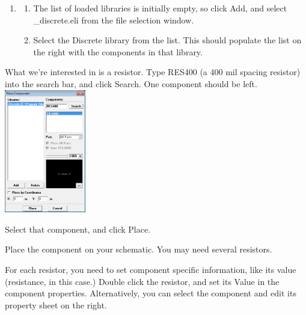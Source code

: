 \documentclass[letterpaper]{article}
\newcounter{saveenum}
\newcommand\liststyleRTFNumvi{%
\renewcommand\theenumi{\arabic{enumi}}
\renewcommand\theenumii{\alph{enumii}}
\renewcommand\theenumiii{\roman{enumiii}}
\renewcommand\theenumiv{\arabic{enumiv}}
\renewcommand\labelenumi{\theenumi.}
\renewcommand\labelenumii{\theenumii.}
\renewcommand\labelenumiii{\theenumiii.}
\renewcommand\labelenumiv{\theenumiv.}
}
\begin{document}
\liststyleRTFNumvi
\setcounter{saveenum}{\value{enumi}}
\begin{enumerate}
\setcounter{enumi}{\value{saveenum}}
\item \setcounter{saveenum}{\value{enumii}}
\begin{enumerate}
\setcounter{enumii}{\value{saveenum}}
\item {\sffamily\color[rgb]{0.30980393,0.5058824,0.7411765}
The list of loaded libraries is initially empty, so click {\textquotedbl}Add{\textquotedbl}, and select
{\textquotedbl}\_discrete.eli{\textquotedbl} from the file selection window.}
\item {\sffamily\color[rgb]{0.30980393,0.5058824,0.7411765}
Select the Discrete library from the list. This should populate the list on the right with the components in that
library.}
\end{enumerate}
\end{enumerate}
{\sffamily\color[rgb]{0.30980393,0.5058824,0.7411765}
What we're interested in is a resistor. Type {\textquotedbl}RES400{\textquotedbl} (a 400 mil spacing resistor) into the
search bar, and click {\textquotedbl}Search.{\textquotedbl} One component should be left.\newline
 \includegraphics[width=1.3957in,height=2.1209in]{figures/ee4document-img020.png} }

{\sffamily\color[rgb]{0.30980393,0.5058824,0.7411765}
Select that component, and click {\textquotedbl}Place.{\textquotedbl}}

{\sffamily\color[rgb]{0.30980393,0.5058824,0.7411765}
Place the component on your schematic. You may need several resistors.}

{\sffamily\color[rgb]{0.30980393,0.5058824,0.7411765}
For each resistor, you need to set component specific information, like its value (resistance, in this case.) Double
click the resistor, and set its Value in the component properties. Alternatively, you can select the component and edit
its property sheet on the right.}
\end{document}
